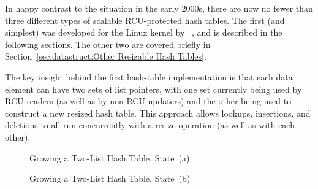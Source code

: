 In happy contrast to the situation in the early 2000s, there are now
no fewer than three different types of scalable RCU-protected hash
tables.
The first (and simplest) was developed for the Linux kernel by
~\cite{HerbertXu2010RCUResizeHash}, and is described in the
following sections.
The other two are covered briefly in
Section~\ref{sec:datastruct:Other Resizable Hash Tables}.

The key insight behind the first hash-table implementation is that
each data element can have two sets of list pointers, with one set
currently being used by RCU readers (as well as by non-RCU updaters)
and the other being used to construct a new resized hash table.
This approach allows lookups, insertions, and deletions to all run
concurrently with a resize operation (as well as with each other).

\begin{figure}[tb]
\centering
{}
\caption{Growing a Two-List Hash Table, State~(a)}
\label{fig:datastruct:Growing a Two-List Hash Table; State (a)}
\end{figure}

\begin{figure}[tb]
\centering
{}
\caption{Growing a Two-List Hash Table, State~(b)}
\label{fig:datastruct:Growing a Two-List Hash Table; State (b)}
\end{figure}

